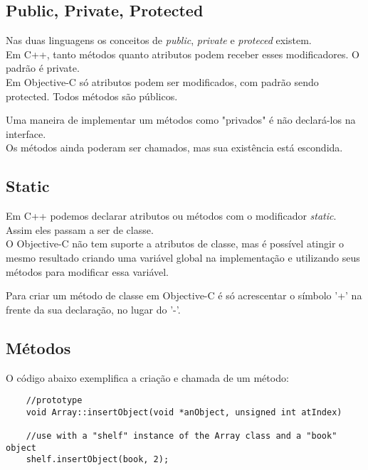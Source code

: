 \documentclass[brazil]{beamer}
\begin{document}
\subsection{Public, Private, Protected}

\begin{frame}
  Nas duas linguagens os conceitos de \textit{public}, \textit{private} e \textit{proteced} existem. \\
  Em C++, tanto métodos quanto atributos podem receber esses modificadores. O padrão é private. \\
  Em Objective-C só atributos podem ser modificados, com padrão sendo protected. Todos métodos são públicos.
\end{frame}

\begin{frame}
  Uma maneira de implementar um métodos como "privados" é não declará-los na interface. \\
  Os métodos ainda poderam ser chamados, mas sua existência está escondida.
\end{frame}

\subsection{Static}

\begin{frame}
  Em C++ podemos declarar atributos ou métodos com o modificador \textit{static}. Assim eles passam a ser de classe. \\
  O Objective-C não tem suporte a atributos de classe, mas é possível atingir o mesmo resultado criando uma variável global 
  na implementação e utilizando seus métodos para modificar essa variável.
\end{frame}

\begin{frame}
  Para criar um método de classe em Objective-C é só acrescentar o símbolo '+' na frente da sua declaração, no lugar do '-'.
\end{frame}

\subsection{Métodos}

\begin{frame}[fragile]
  O código abaixo exemplifica a criação e chamada de um método:
  \lstset{language=C++,basicstyle=\tiny}
  \begin{lstlisting}
    //prototype
    void Array::insertObject(void *anObject, unsigned int atIndex)
    
    //use with a "shelf" instance of the Array class and a "book" object
    shelf.insertObject(book, 2);
  \end{lstlisting}
\end{frame}
\end{document}
